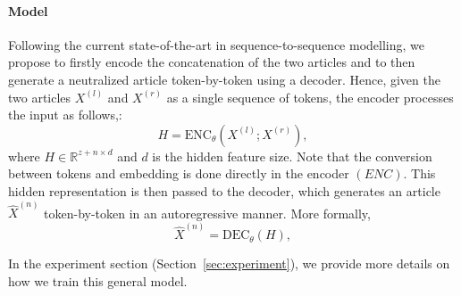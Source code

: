 \documentclass[11pt,a4paper]{article}
\begin{document}
\paragraph{Model} 
Following the current state-of-the-art in sequence-to-sequence modelling, we propose to firstly encode the concatenation of the two articles and to then generate a neutralized article token-by-token using a decoder.
Hence, given the two articles $X^{(l)}$ and $X^{(r)}$ as a single sequence of tokens, the encoder processes the input as follows,:
\begin{equation}
    H = \mathrm{ENC}_{\theta}(X^{(l)};X^{(r)}),
\end{equation}
where $H\in\mathbb{R}^{z+n\times d}$ and $d$ is the hidden feature size. Note that the conversion between tokens and embedding is done directly in the encoder $(ENC)$. This hidden representation is then passed to the decoder, which generates an article $\hat{X}^{(n)}$ token-by-token in an autoregressive manner. More formally,
\begin{equation}
    \hat{X}^{(n)} = \mathrm{DEC}_{\theta}(H),
\end{equation}

In the experiment section (Section~\ref{sec:experiment}), we provide more details on how we train this general model.
\end{document}
